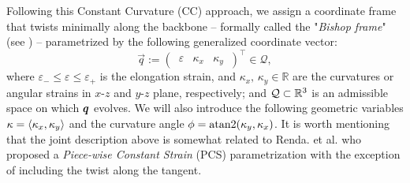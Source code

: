%
{Following this Constant Curvature (CC) approach, we assign a coordinate frame that twists minimally along the backbone -- formally called the "\textit{Bishop frame}" (see \cite{Bishop1975}) -- parametrized by the following generalized coordinate vector:}
%
\begin{equation}
\vec{q} := \begin{pmatrix}
\,\varepsilon & \kappa_x & \kappa_y\,
\end{pmatrix}^\top \in \mathcal{Q},
\label{eq:C2:coordinate}
\end{equation}
%
\noindent where $\varepsilon_{-} \le \varepsilon \le \varepsilon_{+}$ is the elongation strain, and $\kappa_x,\,\kappa_y\in\mathbb{R}$ are the curvatures or angular strains in $x$-$z$ and $y$-$z$ plane, respectively; and $\mathcal{Q} \subset \mathbb{R}^3$ is an admissible space on which ${\boldsymbol{q}}$ evolves. We will also introduce the following geometric variables $\kappa = \langle {\kappa_x}, {\kappa_y} \rangle$ and the curvature angle $\phi = \textup{\textrm{atan2}}(\kappa_y,\kappa_x)$. It is worth mentioning that the joint description above is somewhat related to Renda. et al. \cite{Renda2018} who proposed a \emph{Piece-wise Constant Strain} (PCS) parametrization with the exception of including the twist along the tangent.

